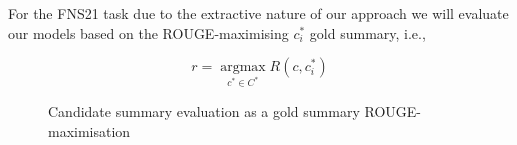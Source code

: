 For the FNS21 task due to the extractive nature of our approach we will evaluate our models based on the ROUGE-maximising $c^{*}_{i}$ gold summary, i.e.,

\begin{figure}[h]
    \centering
    \begin{equation}\label{eq:rouge_max}
        r = \underset{c^{*} \in C^{*}}{\operatorname{argmax}} R(c, c^{*}_{i})
    \end{equation}
    \caption{Candidate summary evaluation as a gold summary ROUGE-maximisation}
    \label{fig:rouge_max}
\end{figure}